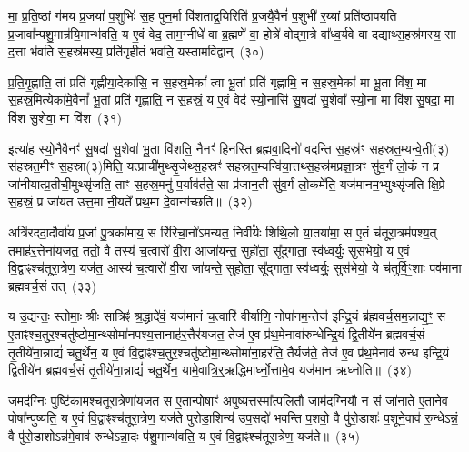 मा॒ प्र॒ति॒ष्ठां ग॑मय प्र॒जया॑ प॒शुभिः॑ स॒ह पुन॒र्मा वि॑शताद्र॒यिरिति॑ प्र॒जयै॒वैनं॑ प॒शुभी॑ र॒य्यां प्रति॑\-ष्ठापयति प्र॒जावा᳚न्पशु॒मान्र॑यि॒मान्भ॑वति॒ य ए॒वं वेद॒ ताम॒ग्नीधे॑ वा ब्र॒ह्मणे॑ वा॒ होत्रे॑ वोद्गा॒त्रे वा᳚ध्व॒र्यवे॑ वा दद्याथ्स॒हस्र॑मस्य॒ सा द॒त्ता भ॑वति स॒हस्र॑मस्य॒ प्रति॑गृहीतं भवति॒ यस्तामवि॑द्वान्~(३०)

प्र॒ति॒गृ॒ह्णाति॒ तां प्रति॑ गृह्णीया॒देका॑सि॒ न स॒हस्र॒मेकां᳚ त्वा भू॒तां प्रति॑ गृह्णामि॒ न स॒हस्र॒मेका॑ मा भू॒ता वि॑श॒ मा स॒हस्र॒मित्येका॑मे॒वैनां᳚ भू॒तां प्रति॑ गृह्णाति॒ न स॒हस्रं॒ य ए॒वं वेद॑ स्यो॒नासि॑ सु॒षदा॑ सु॒शेवा᳚ स्यो॒ना मा वि॑श सु॒षदा॒ मा वि॑श सु॒शेवा॒ मा वि॑श~(३१)

इत्या॑ह स्यो॒नैवैनꣳ॑ सु॒षदा॑ सु॒शेवा॑ भू॒ता वि॑शति॒ नैनꣳ॑ हिनस्ति ब्रह्मवा॒दिनो॑ वदन्ति स॒हस्र॑ꣳ सहस्रत॒म्यन्वे॒ती(३) स॑हस्रत॒मीꣳ स॒हस्रा(३)मिति॒ यत्प्राची॑मुथ्सृ॒जेथ्स॒हस्रꣳ॑ सहस्रत॒म्यन्वि॑या॒त्तथ्स॒हस्र॑मप्रज्ञा॒त्रꣳ सु॑व॒र्गं लो॒कं न प्र जा॑नीयात्प्र॒तीची॒मुथ्सृ॑जति॒ ताꣳ स॒हस्र॒मनु॑ प॒र्याव॑र्तते॒ सा प्र॑जान॒ती सु॑व॒र्गं लो॒कमे॑ति॒ यज॑मानम॒भ्युथ्सृ॑जति क्षि॒प्रे स॒हस्रं॒ प्र जा॑यत उत्त॒मा नी॒यते᳚ प्रथ॒मा दे॒वान्ग॑च्छति॥~(३२)

{\anuvakamend[{लो॒कान्ग॑मयति॒ सावि॑द्वान्थ्सु॒शेवा॒ मावि॑श॒ यज॑मानं॒ द्वाद॑श च}]}%

अत्रि॑रददा॒दौर्वा॑य प्र॒जां पु॒त्रका॑माय॒ स रि॑रिचा॒नो॑\-ऽमन्यत॒ निर्वी᳚र्यः शिथि॒लो या॒तया॑मा॒ स ए॒तं च॑तूरा॒त्रम॑पश्य॒त् तमाह॑र॒त्तेना॑यजत॒ ततो॒ वै तस्य॑ च॒त्वारो॑ वी॒रा आजा॑यन्त॒ सुहो॑ता॒ सू᳚द्गाता॒ स्व॑ध्वर्युः॒ सुस॑भेयो॒ य ए॒वं वि॒द्वाꣴश्च॑तूरा॒त्रेण॒ यज॑त॒ आस्य॑ च॒त्वारो॑ वी॒रा जा॑यन्ते॒ सुहो॑ता॒ सू᳚द्गाता॒ स्व॑ध्वर्युः॒ सुस॑भेयो॒ ये च॑तुर्वि॒ꣳ॒शाः पव॑माना ब्रह्मवर्च॒सं तत्~(३३)

य उ॒द्यन्तः॒ स्तोमाः॒ श्रीः सात्रिꣴ॑ श्र॒द्धादे॑वं॒ यज॑मानं च॒त्वारि॑ वीर्याणि॒ नोपा॑नम॒न्तेज॑ इन्द्रि॒यं ब्र॑ह्मवर्च॒सम॒न्नाद्य॒ꣳ॒ स ए॒ताꣴश्च॒तुर॒श्चतु॑ष्टोमा॒न्थ्सोमा॑नपश्य॒त्तानाह॑र॒त्तैर॑यजत॒ तेज॑ ए॒व प्र॑थ॒मेनावा॑रुन्धेन्द्रि॒यं द्वि॒तीये॑न ब्रह्मवर्च॒सं तृ॒तीये॑ना॒न्नाद्यं॑ चतु॒र्थेन॒ य ए॒वं वि॒द्वाꣴश्च॒तुर॒श्चतु॑ष्टोमा॒न्थ्सोमा॑ना॒हर॑ति॒ तैर्यज॑ते॒ तेज॑ ए॒व प्र॑थ॒मेनाव॑ रुन्ध इन्द्रि॒यं द्वि॒तीये॑न ब्रह्मवर्च॒सं तृ॒तीये॑ना॒न्नाद्यं॑ चतु॒र्थेन॒ यामे॒वात्रि॒र्॒\mbox{}ऋद्धि॒मार्ध्नो॒त्तामे॒व यज॑मान ऋध्नोति॥~(३४)

{\anuvakamend[{तत्तेज॑ ए॒वाष्टाद॑श च}]}%

ज॒मद॑ग्निः॒ पुष्टि॑कामश्चतूरा॒त्रेणा॑यजत॒ स ए॒तान्पोषाꣳ॑ अपुष्य॒त्तस्मा᳚त्पलि॒तौ जाम॑दग्नियौ॒ न सं जा॑नाते ए॒ताने॒व पोषा᳚न्पुष्यति॒ य ए॒वं वि॒द्वाꣴश्च॑तूरा॒त्रेण॒ यज॑ते पुरोडा॒शिन्य॑ उप॒सदो॑ भवन्ति प॒शवो॒ वै पु॑रो॒डाशः॑ प॒शूने॒वाव॑ रु॒न्धे\-ऽन्नं॒ वै पु॑रो॒डाशो\-ऽन्न॑मे॒वाव॑ रुन्धे\-ऽन्ना॒दः प॑शु॒मान्भ॑वति॒ य ए॒वं वि॒द्वाꣴश्च॑तूरा॒त्रेण॒ यज॑ते॥~(३५)

